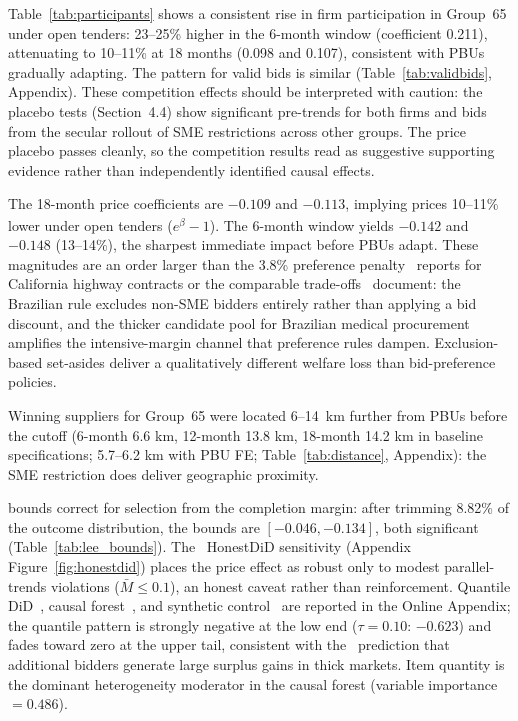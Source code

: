 Table~\ref{tab:participants} shows a consistent rise in firm participation in Group~65 under open tenders: 23--25\% higher in the 6-month window (coefficient 0.211), attenuating to 10--11\% at 18 months (0.098 and 0.107), consistent with PBUs gradually adapting. The pattern for valid bids is similar (Table~\ref{tab:validbids}, Appendix). These competition effects should be interpreted with caution: the placebo tests (Section~4.4) show significant pre-trends for both firms and bids from the secular rollout of SME restrictions across other groups. The price placebo passes cleanly, so the competition results read as suggestive supporting evidence rather than independently identified causal effects.



The 18-month price coefficients are $-0.109$ and $-0.113$, implying prices 10--11\% lower under open tenders ($e^{\hat\beta}-1$). The 6-month window yields $-0.142$ and $-0.148$ (13--14\%), the sharpest immediate impact before PBUs adapt. These magnitudes are an order larger than the 3.8\% preference penalty~\citet{marion2007} reports for California highway contracts or the comparable trade-offs~\citet{krasnokutskaya2011} document: the Brazilian rule excludes non-SME bidders entirely rather than applying a bid discount, and the thicker candidate pool for Brazilian medical procurement amplifies the intensive-margin channel that preference rules dampen. Exclusion-based set-asides deliver a qualitatively different welfare loss than bid-preference policies.

Winning suppliers for Group~65 were located 6--14~km further from PBUs before the cutoff (6-month 6.6 km, 12-month 13.8 km, 18-month 14.2 km in baseline specifications; 5.7--6.2 km with PBU FE; Table~\ref{tab:distance}, Appendix): the SME restriction does deliver geographic proximity.

\citet{lee2009} bounds correct for selection from the completion margin: after trimming 8.82\% of the outcome distribution, the bounds are $[-0.046, -0.134]$, both significant (Table~\ref{tab:lee_bounds}). The~\citet{rambachan2023} HonestDiD sensitivity (Appendix Figure~\ref{fig:honestdid}) places the price effect as robust only to modest parallel-trends violations ($\bar M \le 0.1$), an honest caveat rather than reinforcement. Quantile DiD~\citep{canay2011}, causal forest~\citep{athey2019, wager2018}, and synthetic control~\citep{abadie2010, ben2021} are reported in the Online Appendix; the quantile pattern is strongly negative at the low end ($\tau=0.10$: $-0.623$) and fades toward zero at the upper tail, consistent with the~\citet{bulow1996} prediction that additional bidders generate large surplus gains in thick markets. Item quantity is the dominant heterogeneity moderator in the causal forest (variable importance $=0.486$).

